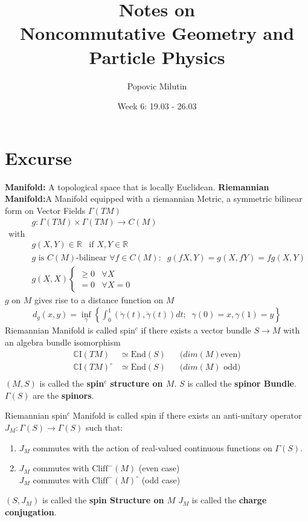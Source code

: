 \documentclass[a4paper]{article}
\title{Notes on \\ Noncommutative Geometry and Particle Physics}
\author{Popovic Milutin}
\date{Week 6: 19.03 - 26.03}
\theoremstyle{definition}
\theoremstyle{definition}
\theoremstyle{definition}
\theoremstyle{theorem}
\theoremstyle{theorem}
\theoremstyle{theorem}
\begin{document}
    \maketitle
    \tableofcontents
    \section{Excurse}
    \textbf{Manifold:} A topological space that is locally Euclidean.
    \newline
    \textbf{Riemannian Manifold:}A Manifold equipped with a riemannian
    Metric, a
    symmetric bilinear form on Vector Fields $\Gamma(TM)$
    \begin{align}
        &g: \Gamma(TM) \times \Gamma(TM) \rightarrow C(M) \\
        \text{with}& \nonumber\\
        &g(X, Y) \in \mathbb{R} \;\;\; \text{if $X, Y \in \mathbb{R}$}\\
        &\text{$g$ is $C(M)$-bilinear } \forall f\in C(M):\;\; g(fX, Y) =
        g(X,
        fY) = fg(X,Y)\\
        &g(X,X) \begin{cases}\geq 0  \;\;\; \forall X \\ = 0 \;\;\; \forall X
            =0
        \end{cases}
    \end{align}
    $g$ on $M$ gives rise to a distance function on $M$
    \begin{align}
        d_g(x, y) = \inf_\gamma \left\{\int_0^1(\dot{\gamma}(t),
        \dot{\gamma}(t))dt;\;\; \gamma(0) = x, \gamma(1) = y \right\}
    \end{align}
    Riemannian Manifold is called spin$^c$ if there exists a vector bundle $S
    \rightarrow M$ with an algebra bundle isomorphism
    \begin{align}
        \mathbb{C}\text{I}(TM) &\simeq \text{End}(S)\;\;\; &\text{($dim(M)$
        even)}\\
        \mathbb{C}\text{I}(TM)^\circ &\simeq \text{End}(S)\;\;\;
        &\text{($dim(M)$ odd)}\\
    \end{align}
    $(M,S)$ is called the \textbf{spin$^c$ structure on $M$}.
    \newline
    $S$ is called the \textbf{spinor Bundle}.
    \newline
    $\Gamma(S)$ are the \textbf{spinors}.

    Riemannian spin$^c$ Manifold is called spin if there exists an
    anti-unitary
    operator $J_M:\Gamma(S) \rightarrow \Gamma(S)$ such that:
    \begin{enumerate}
        \item $J_M$ commutes with the action of real-valued  continuous
            functions
            on $\Gamma(S)$.
        \item $J_M$ commutes with $\text{Cliff}^-(M)$ (even case)\\
        $J_M$ commutes with $\text{Cliff}^-(M)^\circ$ (odd case)
    \end{enumerate}
    $(S, J_M)$ is called the \textbf{spin Structure on $M$}
    \newline
    $J_M$ is called the \textbf{charge conjugation}.
\end{document}

